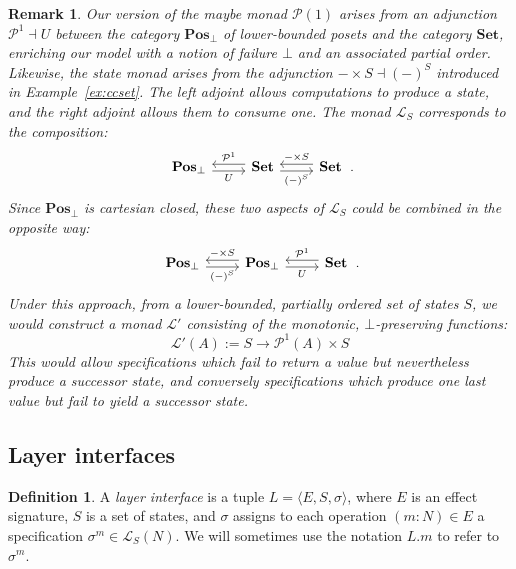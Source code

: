\documentclass[11pt,oneside,draft]{book}
\newtheorem{remark}[theorem]{Remark}
\theoremstyle{definition}
\newtheorem{definition}[theorem]{Definition}
\begin{document}
\begin{remark}
Our version of the \emph{maybe} monad $\mathcal{P}(1)$
arises from an adjunction $\mathcal{P}^1 \dashv U$
between the category $\mathbf{Pos}_\bot$
of lower-bounded posets
and the category $\mathbf{Set}$,
enriching our model with a notion of failure $\bot$
and an associated partial order.
Likewise,
the state monad arises from the adjunction
$- \times S \dashv (-)^S$
introduced in Example~\ref{ex:ccset}.
The left adjoint allows computations to produce a state,
and the right adjoint allows them to consume one.
The monad $\mathcal{L}_S$ corresponds to the composition:
\[
  \begin{tikzcd}
    \mathbf{Pos}_\bot
      \ar[r, "U"', shift right] &
    \mathbf{Set}
      \ar[l, "\mathcal{P}^1"', shift right]
      \ar[r, "(-)^S"', shift right] &
    \mathbf{Set}
      \ar[l, "- \times S"', shift right]
   \end{tikzcd}
  \,.
\]
Since $\mathbf{Pos}_\bot$ is cartesian closed,
these two aspects of $\mathcal{L}_S$
could be combined in the opposite way:
\[
  \begin{tikzcd}
    \mathbf{Pos}_\bot
      \ar[r, "(-)^S"', shift right] &
    \mathbf{Pos}_\bot
      \ar[l, "- \times S"', shift right]
      \ar[r, "U"', shift right] &
    \mathbf{Set}
      \ar[l, "\mathcal{P}^1"', shift right]
   \end{tikzcd}
  \,.
\]
Under this approach,
from a \emph{lower-bounded, partially ordered}
set of states $S$, we would construct a monad $\mathcal{L}'$
consisting of the \emph{monotonic, $\bot$-preserving} functions:
\[
  \mathcal{L}'(A) := S \rightarrow \mathcal{P}^1(A) \times S
\]
This would allow specifications which fail to return a value
but nevertheless produce a successor state,
and conversely specifications which produce one last value
but fail to yield a successor state.
\end{remark}


\subsection{Layer interfaces} %

\begin{definition} %
A \emph{layer interface} is a tuple
$L = \langle E, S, \sigma \rangle$,
where $E$ is an effect signature,
$S$ is a set of states,
and $\sigma$ assigns to each operation
$(m \mathop: N) \in E$
a specification
$\sigma^m \in \mathcal{L}_S(N)$.
We will sometimes use the notation $L.m$
to refer to $\sigma^m$.
\end{definition}
\end{document}
